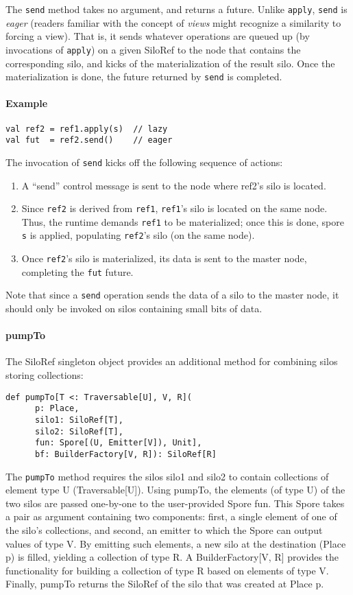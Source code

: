 \documentclass{easychair}
\begin{document}
The \verb|send| method takes no argument, and returns a future. Unlike
\verb|apply|, \verb|send| is \emph{eager} (readers familiar with the concept
of \emph{views} might recognize a similarity to forcing a view). That is, it
sends whatever operations are queued up (by invocations of \verb|apply|) on a
given SiloRef to the node that contains the corresponding silo, and kicks of
the materialization of the result silo. Once the materialization is done, the
future returned by \verb|send| is completed.

\paragraph{Example}

\begin{verbatim}
val ref2 = ref1.apply(s)  // lazy
val fut  = ref2.send()    // eager
\end{verbatim}
\noindent
The invocation of \verb|send| kicks off the following sequence of actions:
\begin{enumerate}
\item A ``send'' control message is sent to the node where ref2's silo is located.
\item Since \verb|ref2| is derived from \verb|ref1|, \verb|ref1|'s silo is located on the same node. Thus, the runtime demands
      \verb|ref1| to be materialized; once this is done, spore \verb|s| is applied, populating \verb|ref2|'s silo (on the same node).
\item Once \verb|ref2|'s silo is materialized, its data is sent to the master node, completing the \verb|fut| future.
\end{enumerate}
\noindent
Note that since a \verb|send| operation sends the data of a silo to the master
node, it should only be invoked on silos containing small bits of data.

\paragraph{pumpTo}

The SiloRef singleton object provides an additional method for combining silos
storing collections:

\begin{verbatim}
def pumpTo[T <: Traversable[U], V, R](
      p: Place,
      silo1: SiloRef[T],
      silo2: SiloRef[T],
      fun: Spore[(U, Emitter[V]), Unit],
      bf: BuilderFactory[V, R]): SiloRef[R]
\end{verbatim}
\noindent
The \verb|pumpTo| method requires the silos silo1 and silo2 to contain collections of
element type U (Traversable[U]). Using pumpTo, the elements (of type U) of the
two silos are passed one-by-one to the user-provided Spore fun. This Spore
takes a pair as argument containing two components: first, a single element of
one of the silo's collections, and second, an emitter to which the Spore can
output values of type V. By emitting such elements, a new silo at the
destination (Place p) is filled, yielding a collection of type R. A
BuilderFactory[V, R] provides the functionality for building a collection of
type R based on elements of type V. Finally, pumpTo returns the SiloRef of the
silo that was created at Place p.
\end{document}
